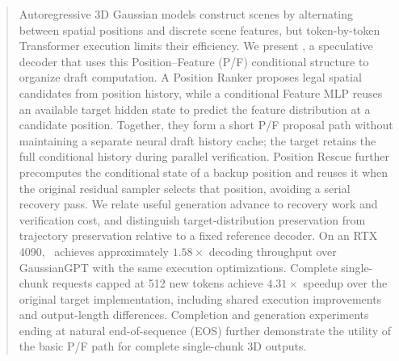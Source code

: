 \begin{abstract}
Autoregressive 3D Gaussian models construct scenes by alternating between spatial positions and discrete scene features, but token-by-token Transformer execution limits their efficiency. We present \PF, a speculative decoder that uses this Position--Feature (P/F) conditional structure to organize draft computation. A Position Ranker proposes legal spatial candidates from position history, while a conditional Feature MLP reuses an available target hidden state to predict the feature distribution at a candidate position. Together, they form a short P/F proposal path without maintaining a separate neural draft history cache; the target retains the full conditional history during parallel verification. Position Rescue further precomputes the conditional state of a backup position and reuses it when the original residual sampler selects that position, avoiding a serial recovery pass. We relate useful generation advance to recovery work and verification cost, and distinguish target-distribution preservation from trajectory preservation relative to a fixed reference decoder. On an RTX 4090, \PF\ achieves approximately $1.58\times$ decoding throughput over GaussianGPT with the same execution optimizations. Complete single-chunk requests capped at 512 new tokens achieve $4.31\times$ speedup over the original target implementation, including shared execution improvements and output-length differences. Completion and generation experiments ending at natural end-of-sequence (EOS) further demonstrate the utility of the basic P/F path for complete single-chunk 3D outputs.
\end{abstract}
